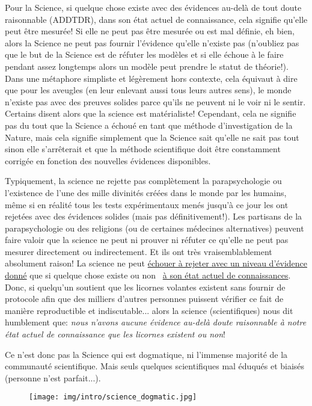 	Pour la Science, si quelque chose existe avec des évidences au-delà de tout doute raisonnable (ADDTDR), dans son état actuel de connaissance, cela signifie qu'elle peut être mesurée! Si elle ne peut pas être mesurée ou est mal définie, eh bien, alors la Science ne peut pas fournir l'évidence qu'elle n'existe pas (n'oubliez pas que le but de la Science est de réfuter les modèles et si elle échoue à le faire pendant assez longtemps alors un modèle peut prendre le statut de théorie!). Dans une métaphore simpliste et légèrement hors contexte, cela équivaut à dire que pour les aveugles (en leur enlevant aussi tous leurs autres sens), le monde n’existe pas avec des preuves solides parce qu’ils ne peuvent ni le voir ni le sentir. Certains disent alors que la science est matérialiste! Cependant, cela ne signifie pas du tout que la Science a échoué en tant que méthode d'investigation de la Nature, mais cela signifie simplement que la Science sait qu'elle ne sait pas tout sinon elle s'arrêterait et que la méthode scientifique doit être constamment corrigée en fonction des nouvelles évidences disponibles.
	
	Typiquement, la science ne rejette pas complètement la parapsychologie ou l'existence de l'une des mille divinités créées dans le monde par les humains, même si en réalité tous les tests expérimentaux menés jusqu'à ce jour les ont rejetées avec des évidences solides (mais pas définitivement!). Les partisans de la parapsychologie ou des religions (ou de certaines médecines alternatives) peuvent faire valoir que la science ne peut ni prouver ni réfuter ce qu'elle ne peut pas mesurer directement ou indirectement. Et ils ont très vraisemblablement absolument raison! La science ne peut \underline{échouer à rejeter avec un niveau d'évidence donné} que si quelque chose existe ou non \ \underline{à son état actuel de connaissances}. Donc, si quelqu'un soutient que les licornes volantes existent sans fournir de protocole afin que des milliers d'autres personnes puissent vérifier ce fait de manière reproductible et indiscutable... alors la science (scientifiques) nous dit humblement que: \textit{nous n'avons aucune évidence au-delà doute raisonnable à notre état actuel de connaissance que les licornes existent ou non}!
	
	Ce n'est donc pas la Science qui est dogmatique, ni l'immense majorité de la communauté scientifique. Mais seuls quelques scientifiques mal éduqués et biaisés (personne n'est parfait...).
	
	\begin{figure}[H]
		\centering
		\texttt{[image: img/intro/science\_dogmatic.jpg]}
	\end{figure}
	
